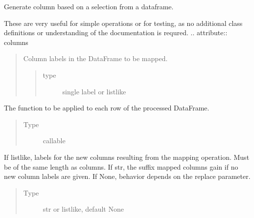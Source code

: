\documentclass[letterpaper,10pt,english]{sphinxmanual}
\begin{document}
\begin{fulllineitems}
\label{\detokenize{beginners-guide:dalio.pipe.col_generation._ColGeneration}}
Generate column based on a selection from a dataframe.

These are very useful for simple operations or for testing, as no
additional class definitions or understanding of the documentation is
requred.
.. attribute:: columns
\begin{quote}

Column labels in the DataFrame
to be mapped.
\begin{quote}\begin{description}
\item[{type}] \leavevmode
single label or list\sphinxhyphen{}like

\end{description}\end{quote}
\end{quote}

\begin{fulllineitems}
\label{\detokenize{beginners-guide:dalio.pipe.col_generation._ColGeneration.func}}
The function to be applied to each row of the
processed DataFrame.
\begin{quote}\begin{description}
\item[{Type}] \leavevmode
callable

\end{description}\end{quote}

\end{fulllineitems}


\begin{fulllineitems}
\label{\detokenize{beginners-guide:dalio.pipe.col_generation._ColGeneration.result_columns}}
If list\sphinxhyphen{}like, labels
for the new columns resulting from the mapping operation. Must be
of the same length as columns. If str, the suffix mapped columns
gain if no new column labels are given. If None, behavior depends
on the replace parameter.
\begin{quote}\begin{description}
\item[{Type}] \leavevmode
str or list\sphinxhyphen{}like, default None


\end{description}
\end{quote}
\end{fulllineitems}
\end{fulllineitems}
\end{document}
